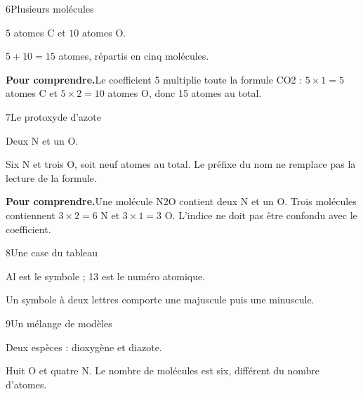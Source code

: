 \par\noindent\begin{minipage}{\linewidth}
\begin{corrige}{6}{Plusieurs molécules}
\begin{questions}
\item $5$ atomes C et $10$ atomes O.
\item $5+10=15$ atomes, répartis en cinq molécules.
\end{questions}
\par\smallskip\noindent\textbf{Pour comprendre.}\enspace Le coefficient 5 multiplie toute la formule CO2 : $5\times1=5$ atomes C et $5\times2=10$ atomes O, donc 15 atomes au total.\par
\end{corrige}
\end{minipage}
\par\noindent\begin{minipage}{\linewidth}
\begin{corrige}{7}{Le protoxyde d’azote}
\begin{questions}
\item Deux N et un O.
\item Six N et trois O, soit neuf atomes au total. Le préfixe du nom ne remplace pas la lecture de la formule.
\end{questions}
\par\smallskip\noindent\textbf{Pour comprendre.}\enspace Une molécule N2O contient deux N et un O. Trois molécules contiennent $3\times2=6$ N et $3\times1=3$ O. L’indice ne doit pas être confondu avec le coefficient.\par
\end{corrige}
\end{minipage}
\par\noindent\begin{minipage}{\linewidth}
\begin{corrige}{8}{Une case du tableau}
\begin{questions}
\item Al est le symbole ; 13 est le numéro atomique.
\item Un symbole à deux lettres comporte une majuscule puis une minuscule.
\end{questions}
\end{corrige}
\end{minipage}
\par\noindent\begin{minipage}{\linewidth}
\begin{corrige}{9}{Un mélange de modèles}
\begin{questions}
\item Deux espèces : dioxygène et diazote.
\item Huit O et quatre N. Le nombre de molécules est six, différent du nombre d’atomes.
\end{questions}
\end{corrige}
\end{minipage}
